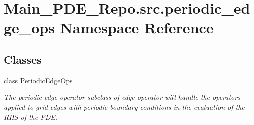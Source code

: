 \hypertarget{namespaceMain__PDE__Repo_1_1src_1_1periodic__edge__ops}{}\section{Main\+\_\+\+P\+D\+E\+\_\+\+Repo.\+src.\+periodic\+\_\+edge\+\_\+ops Namespace Reference}
\label{namespaceMain__PDE__Repo_1_1src_1_1periodic__edge__ops}
\subsection*{Classes}
\begin{DoxyCompactItemize}
\item 
class \hyperlink{classMain__PDE__Repo_1_1src_1_1periodic__edge__ops_1_1PeriodicEdgeOps}{Periodic\+Edge\+Ops}
\begin{DoxyCompactList}\small\item\em The periodic edge operator subclass of edge operator will handle the operators applied to grid edges with periodic boundary conditions in the evaluation of the R\+HS of the P\+DE. \end{DoxyCompactList}\end{DoxyCompactItemize}
